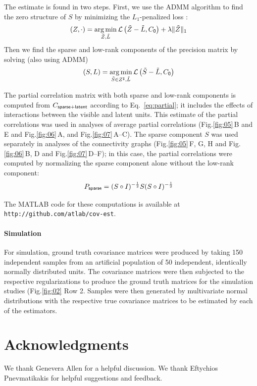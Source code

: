 \documentclass[10pt]{article}
\newcommand{\figref}[2]{Fig.\;\ref{fig:#1}\,#2}
\newcommand{\loss}[1]{\mathcal L\left(#1\right)}
\DeclareMathOperator*{\argmin}{arg\,min}
\begin{document}
The estimate is found in two steps. First, we use the ADMM algorithm to find the zero structure of $S$ by minimizing the $L_1$-penalized loss \cite{Chandrasekaran:2010,Ma:2013}:
\begin{equation}
(Z,\cdot) = \argmin\limits_{\tilde Z,\tilde L} \loss{\tilde Z-\tilde L, C_{\sf 0}} + \lambda\|\tilde Z\|_1
\end{equation}
Then we find the sparse and low-rank components of the precision matrix by solving (also using ADMM) 
\begin{equation}
(S,L) = \argmin\limits_{\tilde S \in Z^\sharp,\tilde L} \loss{\tilde S-\tilde L, C_{\sf 0} }
\end{equation}

The partial correlation matrix with both sparse and low-rank components is computed from $C_{\sf sparse+latent}$ according to Eq.~\ref{eq:partial}; it includes the effects of interactions between the visible and latent units.  This estimate of the partial correlations was used in analyses of average partial correlations (\figref{05}{B and E} and \figref{06}{A}, and \figref{07}{A--C}).  The sparse component $S$ was used separately in analyses of the connectivity graphs (\figref{05}{F, G, H} and \figref{06}{B, D} and \figref{07}{D--F}); in this case, the partial correlations were computed by normalizing the sparse component alone without the low-rank component: 
\begin{equation}
P_{\sf sparse} = (S\circ I)^{-\frac 1 2} S  (S\circ I)^{-\frac 1 2}
\end{equation}

The MATLAB code for these computations is available at {\tt http://github.com/atlab/cov-est}.


\paragraph{Simulation}
For simulation, ground truth covariance matrices were produced by taking 150 independent samples from an artificial population of 50 independent, identically normally distributed units. The covariance matrices were then subjected to the respective regularizations to produce the ground truth matrices for the simulation studies (\figref{02}{\,Row 2}. Samples were then generated by multivariate normal distributions with the respective true covariance matrices to be estimated by each of the estimators. 

\section*{Acknowledgments}
We thank Genevera Allen for a helpful discussion.  We thank Eftychios Pnevmatikakis for helpful suggestions and feedback.
\end{document}
